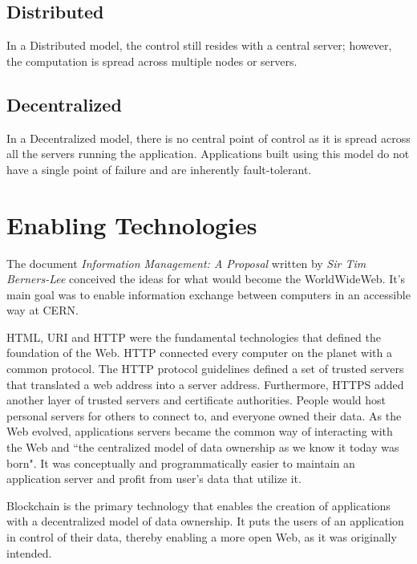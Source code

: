 	\subsection{Distributed}
	In a Distributed model, the control still resides with a central server; however, the computation is spread across multiple nodes or servers.
	
	\subsection{Decentralized}
	In a Decentralized model, there is no central point of control as it is spread across all the servers running the application. Applications built using this model do not have a single point of failure and are inherently fault-tolerant.

\section{Enabling Technologies}
	The document \textit{Information Management: A Proposal}\cite{berners1989information} written by \textit{Sir Tim Berners-Lee} conceived the ideas for what would become the WorldWideWeb. It's main goal was to enable information exchange between computers in an accessible way at CERN.
	
	HTML\cite{msdn:html}, URI\cite{rfc3986} and HTTP\cite{rfc2616} were the fundamental technologies that defined the foundation of the Web. HTTP connected every computer on the planet with a common protocol. The HTTP protocol guidelines defined a set of trusted servers that translated a web address into a server address. Furthermore, HTTPS\cite{rfc2818} added another layer of trusted servers and certificate authorities. People would host personal servers for others to connect to, and everyone owned their data\cite{raval2016decentralized}. As the Web evolved, applications servers became the common way of interacting with the Web and ``the centralized model of data ownership as we know it today was born"\cite{raval2016decentralized}. It was conceptually and programmatically easier to maintain an application server and profit from user's data that utilize it.
	
	Blockchain is the primary technology that enables the creation of applications with a decentralized model of data ownership. It puts the users of an application in control of their data, thereby enabling a more open Web, as it was originally intended\cite{www:foundation}.
	
